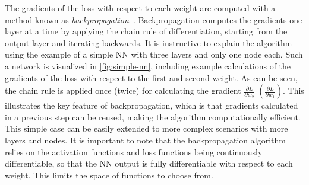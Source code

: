 The gradients of the loss with respect to each weight are computed with a method known as \emph{backpropagation}~\cite{Rumelhart_1986}. Backpropagation computes the gradients one layer at a time by applying the chain rule of differentiation, starting from the output layer and iterating backwards.
It is instructive to explain the algorithm using the example of a simple NN with three layers and only one node each. Such a network is visualized in \cref{fig:simple-nn}, including example calculations of the gradients of the loss with respect to the first and second weight.
As can be seen, the chain rule is applied once (twice) for calculating the gradient $\frac{\partial L}{\partial w_2}$ $\left( \frac{\partial L}{\partial w_1}\right)$. 
This illustrates the key feature of backpropagation, which is that gradients calculated in a previous step can be reused, making the algorithm computationally efficient.
This simple case can be easily extended to more complex scenarios with more layers and nodes.
It is important to note that the backpropagation algorithm relies on the activation functions and loss functions being continuously differentiable, so that the NN output is fully differentiable with respect to each weight. This limits the space of functions to choose from.



